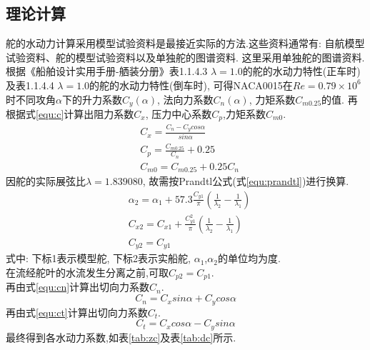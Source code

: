 \documentclass[a4paper,UTF8]{article}
\begin{document}
\subsection{理论计算}
舵的水动力计算采用模型试验资料是最接近实际的方法.这些资料通常有: 自航模型
试验资料、舵的模型试验资料以及单独舵的图谱资料. 这里采用单独舵的图谱资料.根据《船舶设计实用手册-舾装分册》表1.1.4.3 $\lambda=1.0$的舵的水动力特性(正车时)及表1.1.4.4 $\lambda=1.0$的舵的水动力特性(倒车时), 可得NACA0015在$Re=0.79\times 10^6$时不同攻角$\alpha$下的升力系数$C_{y}(\alpha)$, 法向力系数$C_{n}(\alpha)$, 力矩系数$C_{m0.25}$的值. 再根据式\ref{equ:c}计算出阻力系数$C_{x}$, 压力中心系数$C_{p}$,力矩系数$C_{m0}$.
\begin{equation}\label{equ:c}
\begin{split}
&	C_{x}=\frac{C_{n}-C_{y}cos\alpha}{sin\alpha}\\
&C_{p}=\frac{C_{m0.25}}{C_{n}}+0.25\\
&C_{m0}=C_{m0.25}+0.25C_{n}
\end{split}
\end{equation}
因舵的实际展弦比$\lambda=1.839080$, 故需按Prandtl公式(式\ref{equ:prandtl})进行换算.
\begin{equation}\label{equ:prandtl}
\begin{split}
&\alpha_{2}=\alpha_{1}+57.3\frac{C_{y1}}{\pi}(\frac{1}{\lambda_{2}}-\frac{1}{\lambda_{1}})\\
&C_{x2}=C_{x1}+\frac{C_{y1}^2}{\pi}(\frac{1}{\lambda_{2}}-\frac{1}{\lambda_{1}})\\
&C_{y2}=C_{y1}
\end{split}
\end{equation}
式中: 下标1表示模型舵, 下标2表示实船舵, $\alpha_{1}$,$\alpha_{2}$的单位均为度.\\
在流经舵叶的水流发生分离之前,可取$C_{p2}=C_{p1}$.\\
再由式\ref{equ:cn}计算出切向力系数$C_{n}$.
\begin{equation}\label{equ:cn}
C_{n}=C_{x}sin\alpha+C_{y}cos\alpha
\end{equation}
再由式\ref{equ:ct}计算出切向力系数$C_{t}$.
\begin{equation}\label{equ:ct}
	C_{t}=C_{x}cos\alpha-C_{y}sin\alpha
\end{equation}
最终得到各水动力系数,如表\ref{tab:zc}及表\ref{tab:dc}所示.
\end{document}

